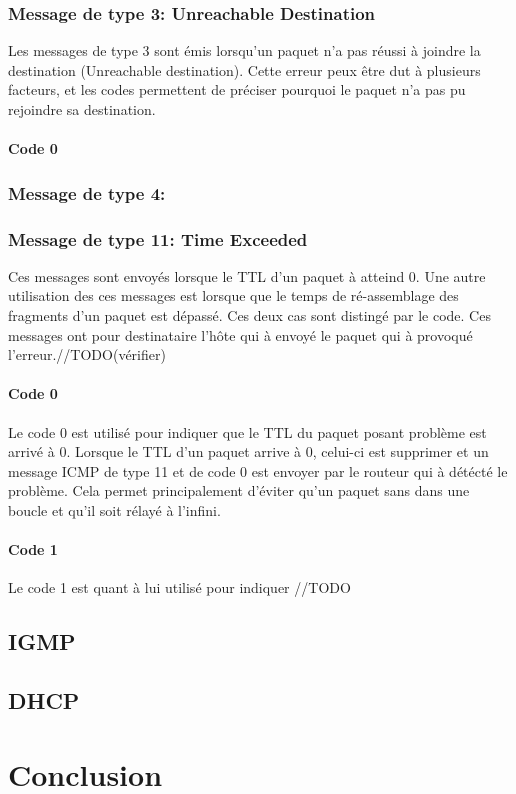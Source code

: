 \documentclass[twoside,openright,a4paper,11pt,french]{article}
\begin{document}
\subsubsection{Message de type 3: Unreachable Destination}
Les messages de type 3 sont émis lorsqu'un paquet n'a pas réussi à joindre la destination (Unreachable destination). Cette erreur peux être dut à plusieurs facteurs, et les codes permettent de préciser pourquoi le paquet n'a pas pu rejoindre sa destination.
\paragraph{Code 0}

\subsubsection{Message de type 4:}
\subsubsection{Message de type 11: Time Exceeded}
Ces messages sont envoyés lorsque le TTL d'un paquet à atteind 0. Une autre utilisation des ces messages est lorsque que le temps de ré-assemblage des fragments d'un paquet est dépassé. Ces deux cas sont distingé par le code. Ces messages ont pour destinataire l'hôte qui à envoyé le paquet qui à provoqué l'erreur.//TODO(vérifier)
\paragraph{Code 0}
Le code 0 est utilisé pour indiquer que le TTL du paquet posant problème est arrivé à 0. Lorsque le TTL d'un paquet arrive à 0, celui-ci est supprimer et un message ICMP de type 11 et de code 0 est envoyer par le routeur qui à détécté le problème. Cela permet principalement d'éviter qu'un paquet sans dans une boucle et qu'il soit rélayé à l'infini.
\paragraph{Code 1}
Le code 1 est quant à lui utilisé pour indiquer //TODO
\subsection{IGMP}
\subsection{DHCP}







\section{Conclusion}
\label{sec:ccl}

\cleardoublepage
{}


\end{document}
